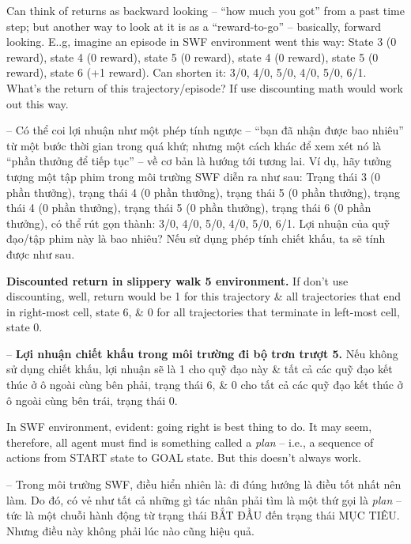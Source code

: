 \documentclass{article}
\begin{document}
\begin{itemize}
\begin{itemize}
        Can think of returns as backward looking -- ``how much you got'' from a past time step; but another way to look at it is as a ``reward-to-go'' -- basically, forward looking. E..g, imagine an episode in SWF environment went this way: State 3 (0 reward), state 4 (0 reward), state 5 (0 reward), state 4 (0 reward), state 5 (0 reward), state 6 (+1 reward). Can shorten it: 3/0, 4/0, 5/0, 4/0, 5/0, 6/1. What’s the return of this trajectory/episode? If use discounting math would work out this way.

        -- Có thể coi lợi nhuận như một phép tính ngược -- ``bạn đã nhận được bao nhiêu'' từ một bước thời gian trong quá khứ; nhưng một cách khác để xem xét nó là ``phần thưởng để tiếp tục'' -- về cơ bản là hướng tới tương lai. Ví dụ, hãy tưởng tượng một tập phim trong môi trường SWF diễn ra như sau: Trạng thái 3 (0 phần thưởng), trạng thái 4 (0 phần thưởng), trạng thái 5 (0 phần thưởng), trạng thái 4 (0 phần thưởng), trạng thái 5 (0 phần thưởng), trạng thái 6 (0 phần thưởng), có thể rút gọn thành: 3/0, 4/0, 5/0, 4/0, 5/0, 6/1. Lợi nhuận của quỹ đạo/tập phim này là bao nhiêu? Nếu sử dụng phép tính chiết khấu, ta sẽ tính được như sau.

        {\bf Discounted return in slippery walk 5 environment.} If don't use discounting, well, return would be 1 for this trajectory \& all trajectories that end in right-most cell, state 6, \& 0 for all trajectories that terminate in left-most cell, state 0.

        -- {\bf Lợi nhuận chiết khấu trong môi trường đi bộ trơn trượt 5.} Nếu không sử dụng chiết khấu, lợi nhuận sẽ là 1 cho quỹ đạo này \& tất cả các quỹ đạo kết thúc ở ô ngoài cùng bên phải, trạng thái 6, \& 0 cho tất cả các quỹ đạo kết thúc ở ô ngoài cùng bên trái, trạng thái 0.

        In SWF environment, evident: going right is best thing to do. It may seem, therefore, all agent must find is something called a {\it plan} -- i.e., a sequence of actions from START state to GOAL state. But this doesn't always work.

        -- Trong môi trường SWF, điều hiển nhiên là: đi đúng hướng là điều tốt nhất nên làm. Do đó, có vẻ như tất cả những gì tác nhân phải tìm là một thứ gọi là {\it plan} -- tức là một chuỗi hành động từ trạng thái BẮT ĐẦU đến trạng thái MỤC TIÊU. Nhưng điều này không phải lúc nào cũng hiệu quả.



\end{itemize}
\end{itemize}
\end{document}
